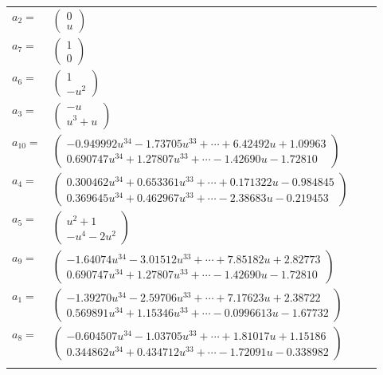 \documentclass[1p]{elsarticle_modified}
\theoremstyle{definition}
\begin{document}
\begin{tabular}{m{7pt} m{180pt} m{7pt} m{180pt} }
\flushright $a_{2}=$&$\begin{pmatrix}0\\u\end{pmatrix}$ \\
\flushright $a_{7}=$&$\begin{pmatrix}1\\0\end{pmatrix}$ \\
\flushright $a_{6}=$&$\begin{pmatrix}1\\- u^2\end{pmatrix}$ \\
\flushright $a_{3}=$&$\begin{pmatrix}- u\\u^3+u\end{pmatrix}$ \\
\flushright $a_{10}=$&$\begin{pmatrix}-0.949992 u^{34}-1.73705 u^{33}+\cdots+6.42492 u+1.09963\\0.690747 u^{34}+1.27807 u^{33}+\cdots-1.42690 u-1.72810\end{pmatrix}$ \\
\flushright $a_{4}=$&$\begin{pmatrix}0.300462 u^{34}+0.653361 u^{33}+\cdots+0.171322 u-0.984845\\0.369645 u^{34}+0.462967 u^{33}+\cdots-2.38683 u-0.219453\end{pmatrix}$ \\
\flushright $a_{5}=$&$\begin{pmatrix}u^2+1\\- u^4-2 u^2\end{pmatrix}$ \\
\flushright $a_{9}=$&$\begin{pmatrix}-1.64074 u^{34}-3.01512 u^{33}+\cdots+7.85182 u+2.82773\\0.690747 u^{34}+1.27807 u^{33}+\cdots-1.42690 u-1.72810\end{pmatrix}$ \\
\flushright $a_{1}=$&$\begin{pmatrix}-1.39270 u^{34}-2.59706 u^{33}+\cdots+7.17623 u+2.38722\\0.569891 u^{34}+1.15346 u^{33}+\cdots-0.0996613 u-1.67732\end{pmatrix}$ \\
\flushright $a_{8}=$&$\begin{pmatrix}-0.604507 u^{34}-1.03705 u^{33}+\cdots+1.81017 u+1.15186\\0.344862 u^{34}+0.434712 u^{33}+\cdots-1.72091 u-0.338982\end{pmatrix}$\\&\end{tabular}
\end{document}
